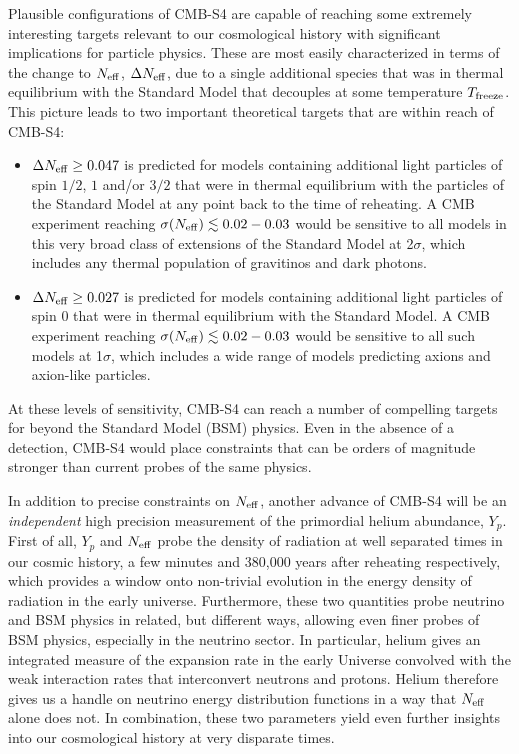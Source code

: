 Plausible configurations of CMB-S4 are capable of reaching some extremely interesting targets relevant to our cosmological history with significant implications for particle physics. These are most easily characterized in terms of the change to $N_{\rm eff}$, $\Delta N_{\rm eff}$, due to a single additional species that was in thermal equilibrium with the Standard Model that decouples at some temperature $T_{\rm freeze}$.  This picture leads to two important theoretical targets that are within reach of CMB-S4:
\begin{itemize}
\item $\Delta N_{\rm eff} \geq 0.047$ is predicted for models containing additional light particles of spin $1/2$, $1$ and/or $3/2$ that were in thermal equilibrium with the particles of the Standard Model at any point back to the time of reheating.  A CMB experiment reaching $\sigma(N_{\rm eff}) \lesssim 0.02-0.03$ would be sensitive to all models in this very broad class of extensions of the Standard Model at 2$\sigma$, which includes any thermal population of gravitinos and dark photons.  %
\item $\Delta N_{\rm eff} \geq  0.027$ is predicted for models containing additional light particles of spin 0 that were in thermal equilibrium with the Standard Model.  A CMB experiment reaching $\sigma(N_{\rm eff}) \lesssim 0.02-0.03$ would be sensitive to all such models at 1$\sigma$, which includes a wide range of models predicting axions and axion-like particles. 
\end{itemize}
At these levels of sensitivity, CMB-S4 can reach a number of compelling targets for beyond the Standard Model (BSM) physics.  Even in the absence of a detection, CMB-S4 would place constraints that can be orders of magnitude stronger than current probes of the same physics.

In addition to precise constraints on $N_{\rm eff}$, another advance of CMB-S4 will be an {\it independent} high precision measurement of the primordial helium abundance, $Y_p$. First of all, $Y_p$ and $N_{\rm eff}$ probe the density of radiation at well separated times in our cosmic history, a few minutes and 380,000 years after reheating respectively, which provides a window onto non-trivial evolution in the energy density of radiation in the early universe.  Furthermore, these two quantities probe neutrino and BSM physics in related, but different ways, allowing even finer probes of BSM physics, especially in the neutrino sector.  In particular, helium gives an integrated measure of the expansion rate in the early Universe convolved with the weak interaction rates that interconvert neutrons and protons. Helium therefore gives us a handle on neutrino energy distribution functions in a way that $N_{\rm eff}$ alone does not.  In combination, these two parameters yield even further insights into our cosmological history at very disparate times.  

